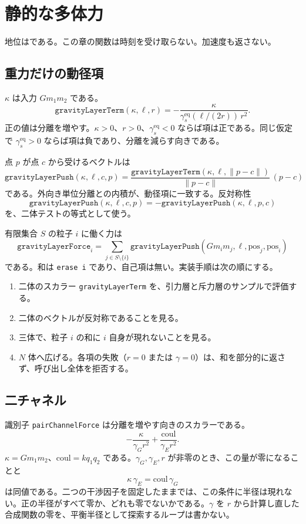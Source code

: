 \section{静的な多体力}
\label{sec:force}

地位は\dstrec{}である。この章の関数は時刻を受け取らない。加速度も返さない。

\subsection{重力だけの動径項}

\(\kappa\) は入力 \(G m_1 m_2\) である。
\[
\texttt{gravityLayerTerm}(\kappa,\ell,r)
=-\frac{\kappa}{\gamma_s^{\mathrm{eq}}(\ell/(2r))\,r^2}.
\]
正の値は分離を増やす。\(\kappa>0\)、\(r>0\)、\(\gamma_s^{\mathrm{eq}}<0\) ならば項は正である。同じ仮定で \(\gamma_s^{\mathrm{eq}}>0\) ならば項は負であり、分離を減らす向きである。

点 \(p\) が点 \(c\) から受けるベクトルは
\[
\texttt{gravityLayerPush}(\kappa,\ell,c,p)
=\frac{\texttt{gravityLayerTerm}(\kappa,\ell,\lVert p-c\rVert)}{\lVert p-c\rVert}\,(p-c)
\]
である。外向き単位分離との内積が、動径項に一致する。反対称性
\[
\texttt{gravityLayerPush}(\kappa,\ell,c,p)
=-\texttt{gravityLayerPush}(\kappa,\ell,p,c)
\]
を、二体テストの等式として使う。

有限集合 \(S\) の粒子 \(i\) に働く力は
\[
\texttt{gravityLayerForce}_i
=\sum_{j\in S\setminus\{i\}}
\texttt{gravityLayerPush}(G m_i m_j,\ell,\mathrm{pos}_j,\mathrm{pos}_i)
\]
である。和は \texttt{erase i} であり、自己項は無い。実装手順は次の順にする。

\begin{enumerate}
\item 二体のスカラー \texttt{gravityLayerTerm} を、引力層と斥力層のサンプルで評価する。
\item 二体のベクトルが反対称であることを見る。
\item 三体で、粒子 \(i\) の和に \(i\) 自身が現れないことを見る。
\item \(N\) 体へ広げる。各項の失敗（\(r=0\) または \(\gamma=0\)）は、和を部分的に返さず、呼び出し全体を拒否する。
\end{enumerate}

\subsection{二チャネル}

識別子 \texttt{pairChannelForce} は分離を増やす向きのスカラーである。
\[
-\frac{\kappa}{\gamma_G r^2}+\frac{\mathrm{coul}}{\gamma_E r^2}.
\]
\(\kappa=G m_1 m_2\)、\(\mathrm{coul}=k q_1 q_2\) である。\(\gamma_G,\gamma_E,r\) が非零のとき、この量が零になることと
\[
\kappa\,\gamma_E=\mathrm{coul}\,\gamma_G
\]
は同値である。二つの干渉因子を固定したままでは、この条件に半径は現れない。正の半径がすべて零か、どれも零でないかである。\(\gamma\) を \(r\) から計算し直した合成関数の零を、平衡半径として探索するループは書かない。

